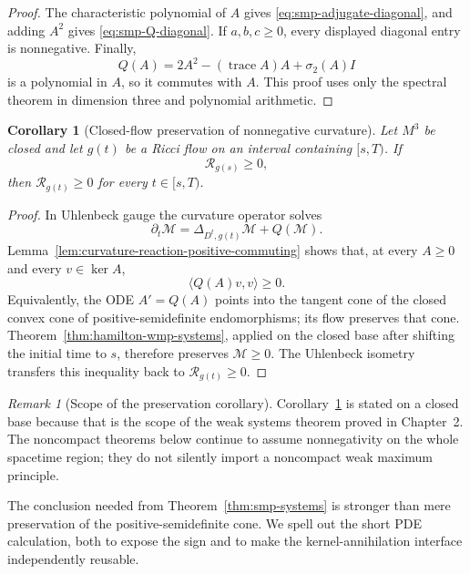 \documentclass[10pt]{coll-l}
\newcommand{\trace}{\operatorname{trace}}
\newtheorem{corollary}[theorem]{Corollary}
\theoremstyle{definition}
\theoremstyle{remark}
\newtheorem{remark}[theorem]{Remark}
\numberwithin{section}{chapter}
\numberwithin{equation}{chapter}
\begin{document}
\begin{proof}
The characteristic polynomial of $A$ gives
\eqref{eq:smp-adjugate-diagonal}, and adding $A^2$ gives
\eqref{eq:smp-Q-diagonal}.  If $a,b,c\geq0$, every displayed diagonal entry
is nonnegative.  Finally,
\[
 Q(A)=2A^2-(\trace A)A+\sigma _2(A)I
\]
is a polynomial in $A$, so it commutes with $A$.  This proof uses only the
spectral theorem in dimension three and polynomial arithmetic.
\end{proof}

\begin{corollary}[Closed-flow preservation of nonnegative curvature]
\label{cor:closed-curvature-operator-preserved}
Let $M^3$ be closed and let $g(t)$ be a Ricci flow on an interval containing
$[s,T)$.  If
\[
                    \mathcal R_{g(s)}\geq0,
\]
then $\mathcal R_{g(t)}\geq0$ for every $t\in[s,T)$.
\end{corollary}

\begin{proof}
In Uhlenbeck gauge the curvature operator solves
\[
                 \partial_t\mathcal M
                  =\Delta_{D^t,g(t)}\mathcal M+Q(\mathcal M).
\]
Lemma~\ref{lem:curvature-reaction-positive-commuting} shows that, at every
$A\geq0$ and every $v\in\ker A$,
\[
                        \langle Q(A)v,v\rangle\geq0.
\]
Equivalently, the ODE $A'=Q(A)$ points into the tangent cone of the closed
convex cone of positive-semidefinite endomorphisms; its flow preserves that
cone.  Theorem~\ref{thm:hamilton-wmp-systems}, applied on the closed base
after shifting the initial time to $s$, therefore preserves
$\mathcal M\geq0$.  The Uhlenbeck isometry transfers this inequality back to
$\mathcal R_{g(t)}\geq0$.
\end{proof}

\begin{remark}[Scope of the preservation corollary]
\label{rem:closed-curvature-preservation-scope}
Corollary~\ref{cor:closed-curvature-operator-preserved} is stated on a
closed base because that is the scope of the weak systems theorem proved in
Chapter~2.  The noncompact theorems below continue to assume nonnegativity
on the whole spacetime region; they do not silently import a noncompact weak
maximum principle.
\end{remark}

The conclusion needed from Theorem~\ref{thm:smp-systems} is stronger than
mere preservation of the positive-semidefinite cone.  We spell out the
short PDE calculation, both to expose the sign and to make the
kernel-annihilation interface independently reusable.
\end{document}
